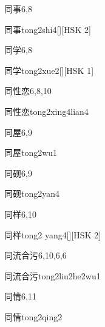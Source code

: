 \begin{entry}{同事}{6,8}
  \begin{phonetics}{同事}{tong2shi4}[][HSK 2]
  \end{phonetics}
\end{entry}

\begin{entry}{同学}{6,8}
  \begin{phonetics}{同学}{tong2xue2}[][HSK 1]
  \end{phonetics}
\end{entry}

\begin{entry}{同性恋}{6,8,10}
  \begin{phonetics}{同性恋}{tong2xing4lian4}
  \end{phonetics}
\end{entry}

\begin{entry}{同屋}{6,9}
  \begin{phonetics}{同屋}{tong2wu1}
  \end{phonetics}
\end{entry}

\begin{entry}{同砚}{6,9}
  \begin{phonetics}{同砚}{tong2yan4}
  \end{phonetics}
\end{entry}

\begin{entry}{同样}{6,10}
  \begin{phonetics}{同样}{tong2 yang4}[][HSK 2]
  \end{phonetics}
\end{entry}

\begin{entry}{同流合污}{6,10,6,6}
  \begin{phonetics}{同流合污}{tong2liu2he2wu1}
  \end{phonetics}
\end{entry}

\begin{entry}{同情}{6,11}
  \begin{phonetics}{同情}{tong2qing2}
  \end{phonetics}
\end{entry}

